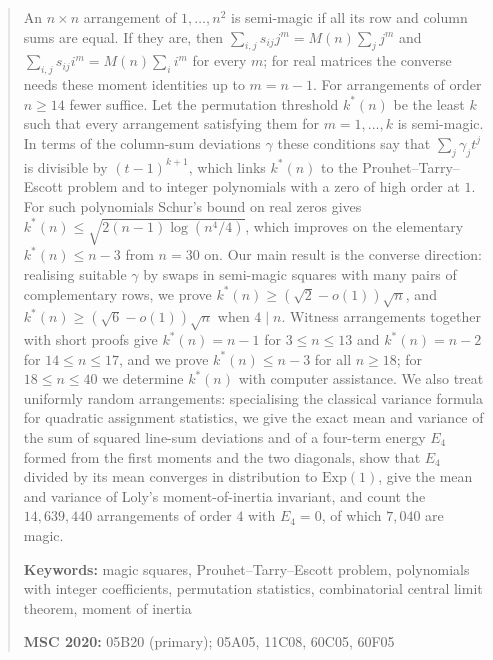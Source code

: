 \begin{abstract}
An $n\times n$ arrangement of $1,\dots,n^2$ is semi-magic if all its row and column sums are equal.
If they are, then $\sum_{i,j}s_{ij}j^m=M(n)\sum_jj^m$ and $\sum_{i,j}s_{ij}i^m=M(n)\sum_ii^m$ for every $m$; for real matrices the converse needs these moment identities up to $m=n-1$.
For arrangements of order $n\ge14$ fewer suffice.
Let the permutation threshold $k^*(n)$ be the least $k$ such that every arrangement satisfying them for $m=1,\dots,k$ is semi-magic.
In terms of the column-sum deviations $\gamma$ these conditions say that $\sum_j\gamma_jt^j$ is divisible by $(t-1)^{k+1}$, which links $k^*(n)$ to the Prouhet--Tarry--Escott problem and to integer polynomials with a zero of high order at $1$.
For such polynomials Schur's bound on real zeros gives $k^*(n)\le\sqrt{2(n-1)\log(n^4/4)}$, which improves on the elementary $k^*(n)\le n-3$ from $n=30$ on.
Our main result is the converse direction: realising suitable $\gamma$ by swaps in semi-magic squares with many pairs of complementary rows, we prove $k^*(n)\ge(\sqrt2-o(1))\sqrt n$, and $k^*(n)\ge(\sqrt6-o(1))\sqrt n$ when $4\mid n$.
Witness arrangements together with short proofs give $k^*(n)=n-1$ for $3\le n\le13$ and $k^*(n)=n-2$ for $14\le n\le17$, and we prove $k^*(n)\le n-3$ for all $n\ge18$; for $18\le n\le40$ we determine $k^*(n)$ with computer assistance.
We also treat uniformly random arrangements: specialising the classical variance formula for quadratic assignment statistics, we give the exact mean and variance of the sum of squared line-sum deviations and of a four-term energy $E_4$ formed from the first moments and the two diagonals, show that $E_4$ divided by its mean converges in distribution to $\mathrm{Exp}(1)$, give the mean and variance of Loly's moment-of-inertia invariant, and count the $14{,}639{,}440$ arrangements of order $4$ with $E_4=0$, of which $7{,}040$ are magic.

\medskip
\noindent\textbf{Keywords:} magic squares, Prouhet--Tarry--Escott problem, polynomials with integer coefficients, permutation statistics, combinatorial central limit theorem, moment of inertia

\noindent\textbf{MSC 2020:} 05B20 (primary); 05A05, 11C08, 60C05, 60F05
\end{abstract}

